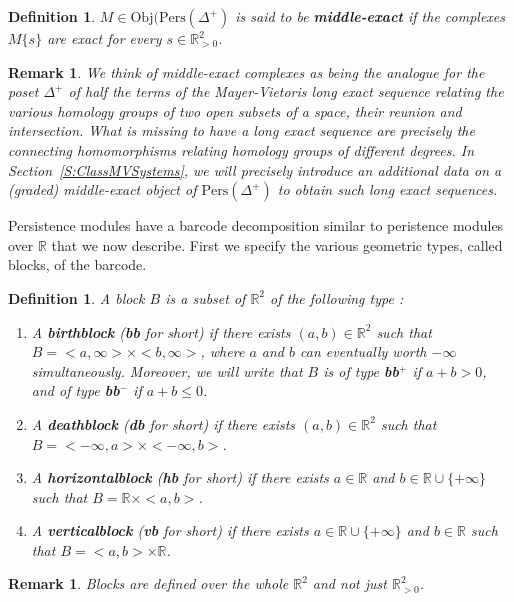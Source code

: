\documentclass[a4paper, english, 11pt]{article}
\newcommand{\0}{\vec{0}}
\newcommand{\R}[0]{\mathbb{R}}
\newcommand{\Obj}[0]{\text{Obj}}
\newcommand{\Pers}[0]{\text{Pers}}
\newtheorem{remark}[prop]{Remark}
\newtheorem{defi}[prop]{Definition}
\begin{document}
\begin{defi}\label{D:middleexact}
$M\in \Obj(\Pers(\Delta^+)$ is said to be \textbf{middle-exact} if the complexes $M\{s\}$ are exact for every $s\in\R^2_{>0} $.
\end{defi}
\begin{remark}
We think of middle-exact complexes as being the analogue for the poset $\Delta^+$ of half the terms of the Mayer-Vietoris long exact sequence relating the various homology groups of two open subsets of a space, their reunion and intersection. What is missing to have a long exact sequence are precisely the connecting homomorphisms relating homology groups of different degrees. In Section~\ref{S:ClassMVSystems}, we will precisely introduce an additional data on a (graded) middle-exact object of $\Pers(\Delta^+)$ to obtain such long exact sequences. 
\end{remark}
Persistence modules have a barcode decomposition similar to peristence modules over $\R$ that we now describe. First we specify the various geometric types, called blocks, of the barcode. 
\begin{defi}\label{def:block_MV}
A block $B$ is a subset of $\R^2$ of the following type : 
\begin{enumerate}
    \item A \textbf{birthblock} (\textbf{bb} for short) if there exists $(a,b)\in \R^2$ such that $B = <a,\infty> \times <b,\infty>$, where $a$ and $b$ can eventually worth $-\infty$ simultaneously. Moreover, we will write that $B$ is of type \textbf{bb$^+$} if $a+b > 0$, and of type \textbf{bb$^-$} if $a+b \leq 0$. 
    \item A \textbf{deathblock} (\textbf{db} for short) if there exists $(a,b)\in \R^2$ such that $B = <-\infty,a> \times <-\infty,b>$.
     \item A \textbf{horizontalblock} (\textbf{hb} for short) if there exists $a\in \R$ and $b\in \R\cup \{+\infty\}$ such that $B = \R \times <a,b>$.
     \item A \textbf{verticalblock} (\textbf{vb} for short) if there exists $a\in \R\cup \{+\infty\}$ and $b\in \R$ such that $B = <a,b> \times \R$.
\end{enumerate}
\end{defi}
\begin{remark}
Blocks are defined over the whole $\R^2$ and not just $\R^2_{>0}$.
\end{remark}
\end{document}
